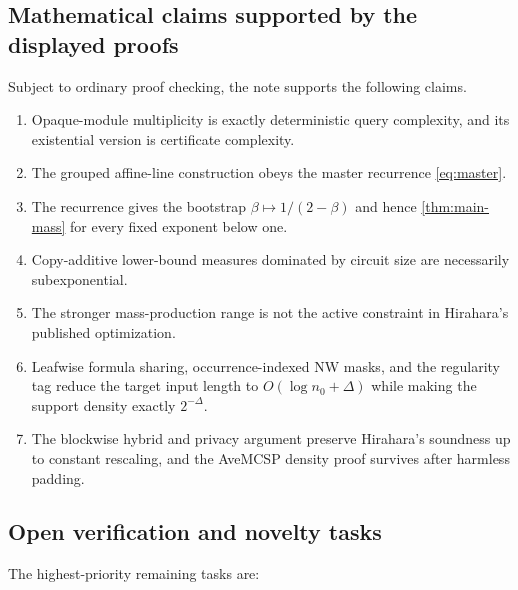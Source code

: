 \documentclass[11pt]{article}
\theoremstyle{definition}
\begin{document}
\subsection{Mathematical claims supported by the displayed proofs}

Subject to ordinary proof checking, the note supports the following claims.

\begin{enumerate}
\item Opaque-module multiplicity is exactly deterministic query complexity, and its existential version is certificate complexity.
\item The grouped affine-line construction obeys the master recurrence \eqref{eq:master}.
\item The recurrence gives the bootstrap
$\beta\mapsto1/(2-\beta)$ and hence \cref{thm:main-mass} for every fixed exponent below one.
\item Copy-additive lower-bound measures dominated by circuit size are necessarily subexponential.
\item The stronger mass-production range is not the active constraint in Hirahara's published optimization.
\item Leafwise formula sharing, occurrence-indexed NW masks, and the regularity tag reduce the target input length to $O(\log n_0+\Delta)$ while making the support density exactly $2^{-\Delta}$.
\item The blockwise hybrid and privacy argument preserve Hirahara's soundness up to constant rescaling, and the AveMCSP density proof survives after harmless padding.
\end{enumerate}

\subsection{Open verification and novelty tasks}

The highest-priority remaining tasks are:
\end{document}
